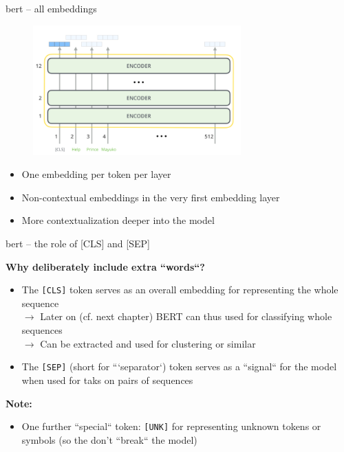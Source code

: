 
\begin{frame}{bert -- all embeddings}

\vfill

\begin{figure}
	\centering
	\includegraphics[width = 8cm]{figure/bert-embedings.png}\\ 
\end{figure}

\begin{itemize}
	\item One embedding per token per layer
	\item Non-contextual embeddings in the very first embedding layer
	\item More contextualization deeper into the model
\end{itemize}

\vfill

\end{frame}


\begin{frame}{bert -- the role of [CLS] and [SEP]}

\vfill

\textbf{Why deliberately include extra ``words``?}

\begin{itemize}
	\item The \texttt{[CLS]} token serves as an overall embedding for representing the whole sequence\\
				$\to$ Later on (cf. next chapter) BERT can thus used for classifying whole sequences\\
				$\to$ Can be extracted and used for clustering or similar
	\item The \texttt{[SEP]} (short for ```separator`) token serves as a ``signal`` for the model when used for taks on pairs of sequences
\end{itemize}

\textbf{Note:}

\begin{itemize}
	\item One further ``special`` token: \texttt{[UNK]} for representing unknown tokens or symbols (so the don't ``break`` the model)
\end{itemize}

\vfill

\end{frame}

